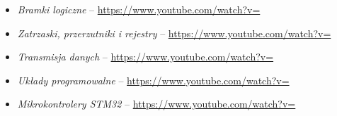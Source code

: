 % 
% 
% 
% 

\begin{itemize}
\item \emph{Bramki logiczne} – \url{https://www.youtube.com/watch?v=}
\item \emph{Zatrzaski, przerzutniki i rejestry} – \url{https://www.youtube.com/watch?v=}
\item \emph{Transmisja danych} – \url{https://www.youtube.com/watch?v=}
\item \emph{Układy programowalne} – \url{https://www.youtube.com/watch?v=}
\item \emph{Mikrokontrolery STM32} – \url{https://www.youtube.com/watch?v=}
\end{itemize}
